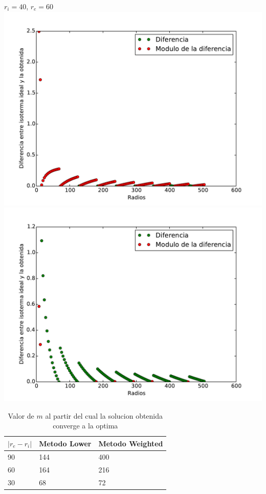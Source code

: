 $r_i = 40$, $r_e = 60$ \\
\includegraphics[scale=0.45]{graficos/mVariable_l_40_60.pdf}
\includegraphics[scale=0.45]{graficos/mVariable_w_40_60.pdf}
\newline

\begin{table}[]
\centering
\caption{Valor de $m$ al partir del cual la solucion obtenida converge a la optima}
\label{tabla-metodos-isotermas}
\begin{tabular}{lll}
\hline
$\vert r_e - r_i \vert$ & Metodo Lower & Metodo Weighted \\ \hline
90                      & 144          & 400             \\
60                      & 164          & 216             \\
30                      & 68           & 72              \\ \hline
\end{tabular}
\end{table}

